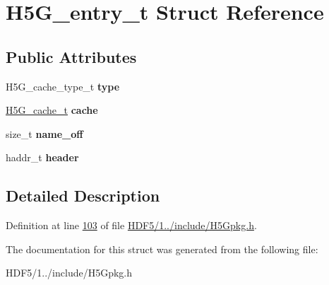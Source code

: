\hypertarget{struct_h5_g__entry__t}{}\section{H5\+G\+\_\+entry\+\_\+t Struct Reference}
\label{struct_h5_g__entry__t}
\subsection*{Public Attributes}
\begin{DoxyCompactItemize}
\item 
\mbox{\label{struct_h5_g__entry__t_a35fbb60444b0c911879deca6f38872c5}} 
H5\+G\+\_\+cache\+\_\+type\+\_\+t {\bfseries type}
\item 
\mbox{\label{struct_h5_g__entry__t_a320e2baaff38516f8b12f771a0eeb0a9}} 
\hyperlink{union_h5_g__cache__t}{H5\+G\+\_\+cache\+\_\+t} {\bfseries cache}
\item 
\mbox{\label{struct_h5_g__entry__t_ac17364c3c74a144a02b276a0c541cca3}} 
size\+\_\+t {\bfseries name\+\_\+off}
\item 
\mbox{\label{struct_h5_g__entry__t_ae24b57a5453faa79d29de40cfbcb8027}} 
haddr\+\_\+t {\bfseries header}
\end{DoxyCompactItemize}


\subsection{Detailed Description}


Definition at line \hyperlink{_h_d_f5_21_810_81_2include_2_h5_gpkg_8h_source_l00103}{103} of file \hyperlink{_h_d_f5_21_810_81_2include_2_h5_gpkg_8h_source}{H\+D\+F5/1../include/\+H5\+Gpkg.\+h}.



The documentation for this struct was generated from the following file\+:\begin{DoxyCompactItemize}
\item 
H\+D\+F5/1../include/\+H5\+Gpkg.\+h\end{DoxyCompactItemize}
